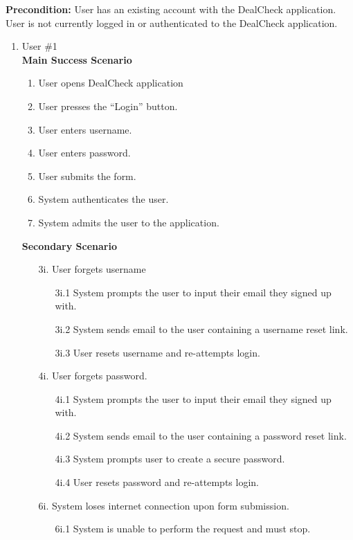 \documentclass[]{article}
\begin{document}
\begin{enumerate}[{\bf {BE}1.}]
	{\bf Precondition:} User has an existing account with the DealCheck application. 
	User is not currently logged in or authenticated to the DealCheck application.
	\begin{enumerate}[{\bf VP1.}]
		\item User \#1 \\
		{\bf Main Success Scenario}
		\begin{enumerate}[1.]
			\item User opens DealCheck application
			\item User presses the “Login” button.
			\item User enters username.
			\item User enters password.
			\item User submits the form.
			\item System authenticates the user.
			\item System admits the user to the application.
		\end{enumerate}
		{\bf Secondary Scenario} \\
		\begin{enumerate}
                \item [3i.] User forgets username
    		\begin{enumerate}
    			\item [3i.1] System prompts the user to input their email they signed up with.
    			\item [3i.2] System sends email to the user containing a username reset link.
    			\item [3i.3] User resets username and re-attempts login.
    		\end{enumerate}
    		\item [4i.] User forgets password.
    		\begin{enumerate}
    			\item [4i.1] System prompts the user to input their email they signed up with.
    			\item [4i.2] System sends email to the user containing a password reset link.
    			\item [4i.3] System prompts user to create a secure password.
    			\item [4i.4] User resets password and re-attempts login.
    		\end{enumerate}
    		\item [6i.] System loses internet connection upon form submission.
    		\begin{enumerate}
    			\item [6i.1] System is unable to perform the request and must stop.

\end{enumerate}
\end{enumerate}
\end{enumerate}
\end{enumerate}
\end{document}

